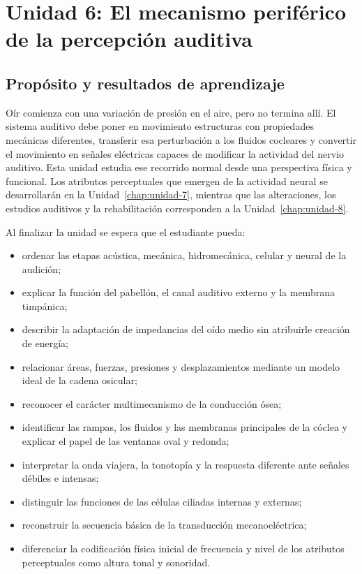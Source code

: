 \chapter[Unidad 6: El mecanismo de la percepción auditiva]{Unidad 6: El mecanismo periférico de la percepción auditiva}
\label{chap:unidad-6}

\section{Propósito y resultados de aprendizaje}
\label{sec:u6-proposito}

Oír comienza con una variación de presión en el aire, pero no termina allí. El
sistema auditivo debe poner en movimiento estructuras con propiedades
mecánicas diferentes, transferir esa perturbación a los fluidos cocleares y
convertir el movimiento en señales eléctricas capaces de modificar la
actividad del nervio auditivo. Esta unidad estudia ese recorrido normal desde
una perspectiva física y funcional. Los atributos perceptuales que emergen de
la actividad neural se desarrollarán en la
Unidad~\ref{chap:unidad-7}, mientras que las alteraciones, los estudios
auditivos y la rehabilitación corresponden a la
Unidad~\ref{chap:unidad-8}.

Al finalizar la unidad se espera que el estudiante pueda:

\begin{itemize}
    \item ordenar las etapas acústica, mecánica, hidromecánica, celular y
    neural de la audición;
    \item explicar la función del pabellón, el canal auditivo externo y la
    membrana timpánica;
    \item describir la adaptación de impedancias del oído medio sin atribuirle
    creación de energía;
    \item relacionar áreas, fuerzas, presiones y desplazamientos mediante un
    modelo ideal de la cadena osicular;
    \item reconocer el carácter multimecanismo de la conducción ósea;
    \item identificar las rampas, los fluidos y las membranas principales de
    la cóclea y explicar el papel de las ventanas oval y redonda;
    \item interpretar la onda viajera, la tonotopía y la respuesta diferente
    ante señales débiles e intensas;
    \item distinguir las funciones de las células ciliadas internas y
    externas;
    \item reconstruir la secuencia básica de la transducción
    mecanoeléctrica;
    \item diferenciar la codificación física inicial de frecuencia y nivel de
    los atributos perceptuales como altura tonal y sonoridad.
\end{itemize}

